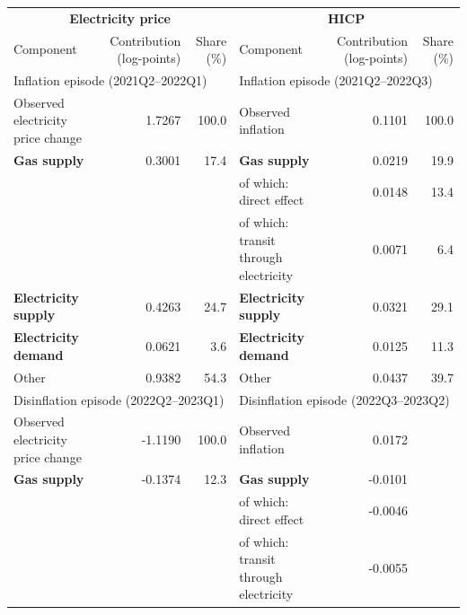 \begin{tabular}{lrrlrr}
\toprule
\multicolumn{3}{c}{\textbf{Electricity price}} & \multicolumn{3}{c}{\textbf{HICP}} \\
Component & Contribution (log-points) & Share (\%) & Component & Contribution (log-points) & Share (\%) \\
\midrule
\multicolumn{3}{l}{Inflation episode (2021Q2--2022Q1)} & \multicolumn{3}{l}{Inflation episode (2021Q2--2022Q3)} \\[2.5pt]
\midrule
Observed electricity price change & 1.7267 & 100.0 & Observed inflation & 0.1101 & 100.0 \\
{\bfseries \hspace*{7.5pt} Gas supply} & 0.3001 & 17.4 & {\bfseries \hspace*{7.5pt} Gas supply} & 0.0219 & 19.9 \\
 &  &  & \hspace*{15pt} of which: direct effect & 0.0148 & 13.4 \\
 &  &  & \hspace*{15pt} of which: transit through electricity & 0.0071 & 6.4 \\
{\bfseries \hspace*{7.5pt} Electricity supply} & 0.4263 & 24.7 & {\bfseries \hspace*{7.5pt} Electricity supply} & 0.0321 & 29.1 \\
{\bfseries \hspace*{7.5pt} Electricity demand} & 0.0621 & 3.6 & {\bfseries \hspace*{7.5pt} Electricity demand} & 0.0125 & 11.3 \\
\hspace*{7.5pt} Other & 0.9382 & 54.3 & \hspace*{7.5pt} Other & 0.0437 & 39.7 \\
\midrule
\multicolumn{3}{l}{Disinflation episode (2022Q2--2023Q1)} & \multicolumn{3}{l}{Disinflation episode (2022Q3--2023Q2)} \\[2.5pt]
\midrule
Observed electricity price change & -1.1190 & 100.0 & Observed inflation & 0.0172 &  \\
{\bfseries \hspace*{7.5pt} Gas supply} & -0.1374 & 12.3 & {\bfseries \hspace*{7.5pt} Gas supply} & -0.0101 &  \\
 &  &  & \hspace*{15pt} of which: direct effect & -0.0046 &  \\
 &  &  & \hspace*{15pt} of which: transit through electricity & -0.0055 &  \\

\end{tabular}
